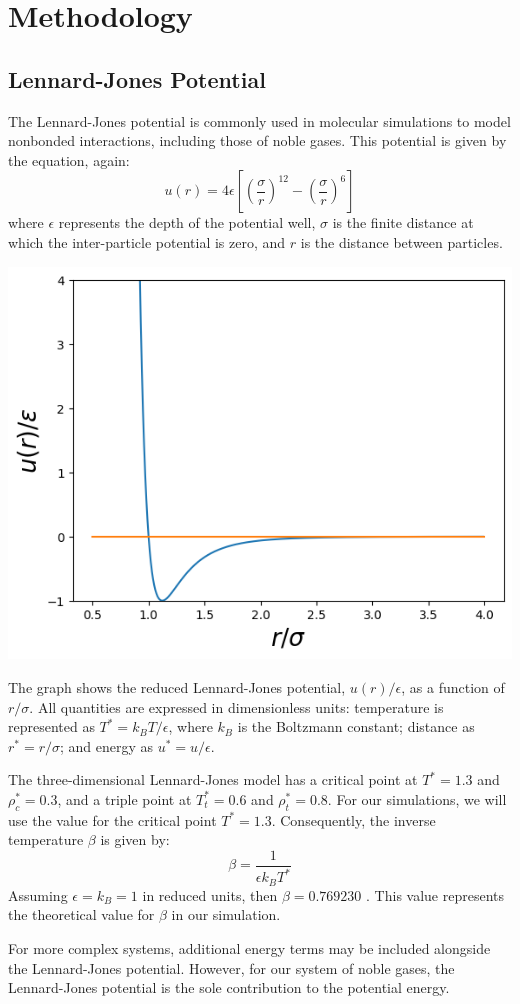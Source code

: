 \documentclass[a4paper,12pt]{article}
\begin{document}
 
\section{Methodology}
\subsection{Lennard-Jones Potential}
The Lennard-Jones potential is commonly used in molecular simulations to model nonbonded interactions, including those of noble gases. This potential is given by the equation, again:
\begin{equation}
    u(r) = 4\epsilon \left[ \left( \frac{\sigma}{r} \right)^{12} - \left( \frac{\sigma}{r} \right)^{6} \right]
\end{equation}
where \( \epsilon \) represents the depth of the potential well, \( \sigma \) is the finite distance at which the inter-particle potential is zero, and \( r \) is the distance between particles.

\begin{multicols}{2}
\begin{center}
 \includegraphics[width = 7.5 cm]{01.png}
\end{center}
The graph shows the reduced Lennard-Jones potential, \( u(r) /\epsilon \), as a function of \( r/\sigma \). All quantities are expressed in dimensionless units: temperature is represented as \( T^* = k_B T/\epsilon \), where \( k_B \) is the Boltzmann constant; distance as \( r^* = r/\sigma \); and energy as \( u^* = u/\epsilon \).

The three-dimensional Lennard-Jones model has a critical point at \( T^* = 1.3 \) and \( \rho^*_c = 0.3 \), and a triple point at \( T^*_t = 0.6 \) and \( \rho^*_t = 0.8 \). For our simulations, we will use the value for the critical point \( T^* = 1.3 \). Consequently, the inverse temperature \( \beta \) is given by:
\begin{equation}
    \beta = \frac{1}{\epsilon k_B T^*}
\end{equation}
Assuming \( \epsilon = k_B = 1 \) in reduced units, then \( \beta = 0.769230 \) \citep{Viot2016}. This value represents the theoretical value for \( \beta \) in our simulation.

For more complex systems, additional energy terms may be included alongside the Lennard-Jones potential. However, for our system of noble gases, the Lennard-Jones potential is the sole contribution to the potential energy.

\end{multicols}
\end{document}
